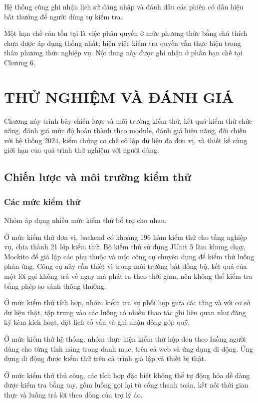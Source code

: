 \documentclass[12pt,a4paper,oneside]{report}
\begin{document}
Hệ thống cũng ghi nhận lịch sử đăng nhập và đánh dấu các phiên có dấu hiệu bất thường để người dùng tự kiểm tra.

Một hạn chế còn tồn tại là việc phân quyền ở mức phương thức bằng chú thích chưa được áp dụng thống nhất; hiện việc kiểm tra quyền vẫn thực hiện trong thân phương thức nghiệp vụ. Nội dung này được ghi nhận ở phần hạn chế tại Chương 6.

\chapter{THỬ NGHIỆM VÀ ĐÁNH GIÁ}

Chương này trình bày chiến lược và môi trường kiểm thử, kết quả kiểm thử chức năng, đánh giá mức độ hoàn thành theo module, đánh giá hiệu năng, đối chiếu với hệ thống 2024, kiểm chứng cơ chế cô lập dữ liệu đa đơn vị, và thiết kế cùng giới hạn của quá trình thử nghiệm với người dùng.

\section{Chiến lược và môi trường kiểm thử}

\subsection{Các mức kiểm thử}

Nhóm áp dụng nhiều mức kiểm thử bổ trợ cho nhau.

Ở mức kiểm thử đơn vị, backend có khoảng 196 hàm kiểm thử cho tầng nghiệp vụ, chia thành 21 lớp kiểm thử. Bộ kiểm thử sử dụng JUnit 5 làm khung chạy, Mockito để giả lập các phụ thuộc và một công cụ chuyên dụng để kiểm thử luồng phản ứng. Công cụ này cần thiết vì trong môi trường bất đồng bộ, kết quả của một lời gọi không trả về ngay mà phát ra theo thời gian, nên không thể kiểm tra bằng phép so sánh thông thường.

Ở mức kiểm thử tích hợp, nhóm kiểm tra sự phối hợp giữa các tầng và với cơ sở dữ liệu thật, tập trung vào các luồng có nhiều thao tác ghi liên quan như đăng ký kèm kích hoạt, đặt lịch cố vấn và ghi nhận đóng góp quỹ.

Ở mức kiểm thử hệ thống, nhóm thực hiện kiểm thử hộp đen theo luồng người dùng cho từng tính năng trong danh mục, trên cả web và ứng dụng di động. Ứng dụng di động được kiểm thử trên cả trình giả lập và thiết bị thật.

Ở mức kiểm thử thủ công, các tích hợp đặc biệt không thể tự động hóa dễ dàng được kiểm tra bằng tay, gồm luồng gọi lại từ cổng thanh toán, kết nối thời gian thực và luồng trả lời theo dòng của trợ lý ảo.
\end{document}

